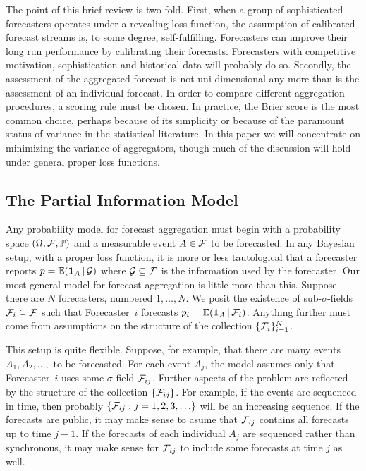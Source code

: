 \documentclass[11pt]{article}
\renewcommand{\P}{\mathbb{P}}
\newcommand{\E}{\mathbb{E}}
\theoremstyle{definition}
\theoremstyle{definition}
\def\one{{\bf 1}}
\def\F{{\cal F}}
\def\G{{\cal G}}
\def\P{{\mathbb P}}
\def\E{{\mathbb E}}
\def\|{\, | \,}
\begin{document}
The point of this brief review is two-fold.  First, when a group of
sophisticated forecasters operates under a revealing loss function,
the assumption of calibrated forecast streams is, to some degree, 
self-fulfilling.  Forecasters can improve their long run 
performance by calibrating their forecasts. Forecasters with 
competitive motivation, sophistication and historical data
will probably do so.  Secondly, the assessment of the aggregated forecast
is not uni-dimensional any more than is the assessment of an
individual forecast.  In order to compare different aggregation 
procedures, a scoring rule must be chosen.  In practice, the
Brier score is the most common choice, perhaps because of its simplicity
or because of the paramount status of variance in the statistical
literature.  In this paper we will concentrate on minimizing the
variance of aggregators, though much of the discussion will hold under
general proper loss functions.

\subsection{The Partial Information Model}

Any probability model for forecast aggregation must begin with a 
probability space $(\Omega, \F , \P)$ and a measurable event
$A \in \F$ to be forecasted.  In any Bayesian setup, with a proper 
loss function, it is more or less tautological that a forecaster
reports $p = \E (\one_A \| \G)$ where $\G \subseteq \F$ is the
information used by the forecaster.  Our most general model for
forecast aggregation is little more than this.  Suppose there are
$N$ forecasters, numbered $1, \ldots, N$.  We posit the existence
of sub-$\sigma$-fields $\F_i \subseteq \F$ such that Forecaster~$i$
forecasts $p_i = \E (\one_A \| \F_i)$.  Anything further must come from
assumptions on the structure of the collection $\{ \F_i \}_{i=1}^N$.

This setup is quite flexible.  Suppose, for example, that there are
many events $A_1, A_2 , \ldots,$ to be forecasted.  For each event 
$A_j$, the model assumes only that Forecaster~$i$ uses some 
$\sigma$-field $\F_{ij}$.  Further aspects of the problem are
reflected by the structure of the collection $\{ \F_{ij} \}$.
For example, if the events are sequenced in time, then probably
$\{ \F_{ij} : j = 1 , 2, 3, \ldots \}$ will be an increasing 
sequence.  If the forecasts are public, it may make sense to 
asume that $\F_{ij}$ contains all forecasts up to time $j-1$.
If the forecasts of each individual $A_j$ are sequenced rather 
than synchronous, it may make sense for $\F_{ij}$ to include
some forecasts at time $j$ as well.  
\end{document}
